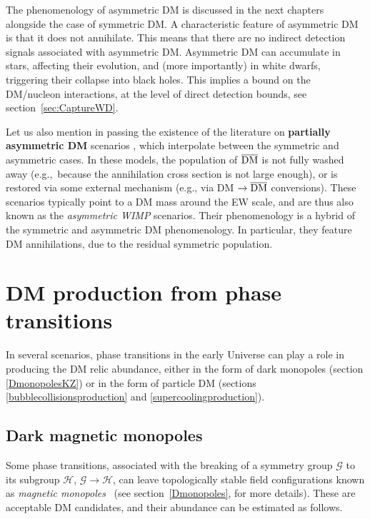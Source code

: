\bigskip

The phenomenology of asymmetric DM is discussed in the next chapters alongside the case of symmetric DM. A characteristic feature of asymmetric DM is that it does not annihilate. This means that there are no indirect detection signals associated with asymmetric DM. Asymmetric DM can accumulate in stars, affecting their evolution, and (more importantly) in white dwarfs, triggering their collapse into black holes.
This implies a bound on the DM/nucleon interactions, at the level of direct detection bounds, see section~\ref{sec:CaptureWD}. 

\bigskip

Let us also mention in passing the existence of the literature on {\bf partially asymmetric DM} scenarios \cite{AsymmetricDM}, which interpolate between the symmetric and asymmetric cases. In these models, the population of $\overline{\rm DM}$ is not fully washed away (e.g.,~because the annihilation cross section is not large enough), or is restored via some external mechanism (e.g., via DM $\to \overline{\rm DM}$ conversions). These scenarios typically point to a DM mass around the EW scale, and are thus also known as the {\em asymmetric WIMP} scenarios. Their phenomenology is a hybrid of the symmetric and asymmetric DM phenomenology. In particular, they feature DM annihilations, due to the residual symmetric population.








\section{DM production from phase transitions}
\label{sec:DMprodPT}

In several scenarios, phase transitions in the early Universe can play a role in producing the DM relic abundance, either in the form of dark monopoles (section \ref{DmonopolesKZ}) or in the form of particle DM (sections \ref{bubblecollisionsproduction} and \ref{supercoolingproduction}).

\subsection{Dark magnetic monopoles}
\label{DmonopolesKZ}
Some phase transitions, associated with the breaking of a symmetry group $\mathcal{G}$ to its subgroup $\mathcal{H}$, $\mathcal{G}\to \mathcal{H}$, can leave 
topologically stable field configurations known as {\em magnetic monopoles}~\cite{DarkMonopoles} (see section~\ref{Dmonopoles}, for more details).
These are acceptable DM candidates, and their abundance can be estimated as follows.

